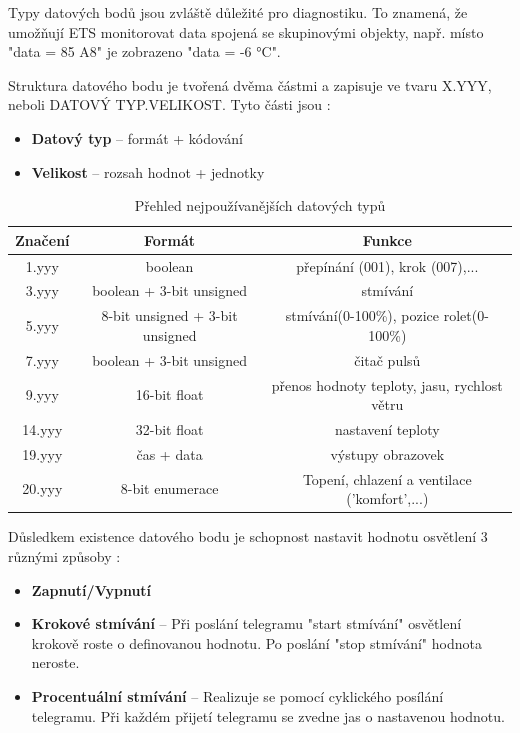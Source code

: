 \noindent Typy datových bodů jsou zvláště důležité pro diagnostiku. To znamená, že umožňují ETS monitorovat data spojená se skupinovými objekty, např. místo "data = 85 A8" je zobrazeno "data = -6 °C". \cite{Datapoint}

Struktura datového bodu je tvořená dvěma částmi a zapisuje ve tvaru X.YYY, neboli DATOVÝ TYP.VELIKOST. Tyto části jsou \cite{Datapoint}:
\begin{itemize}
    \item \textbf{Datový typ} -- formát + kódování
    \item \textbf{Velikost} -- rozsah hodnot + jednotky \newline
\end{itemize}

\begin{table}[!ht]
 \caption[Přehled nejpoužívanějších datových typů]{Přehled nejpoužívanějších datových typů}
   \small
    \centering
	  \begin{tabular}{|c|c|c|}
	    \hline
	    Značení & Formát  & Funkce  \\
	    \hline\hline
	    1.yyy & boolean & přepínání (001), krok (007),... \\
	    \hline
	    3.yyy & boolean + 3-bit unsigned & stmívání \\
	    \hline
	    5.yyy & 8-bit unsigned + 3-bit unsigned & stmívání(0-100\%), pozice rolet(0-100\%)\\
	    \hline
	    7.yyy & boolean + 3-bit unsigned & čitač pulsů \\
	    \hline
	    9.yyy & 16-bit float & přenos hodnoty teploty, jasu, rychlost větru \\
	    \hline
	    14.yyy & 32-bit float & nastavení teploty\\
	    \hline
	    19.yyy & čas + data & výstupy obrazovek \\
	    \hline
	    20.yyy & 8-bit enumerace & Topení, chlazení a ventilace ('komfort',...) \\
	    \hline
	  \end{tabular}
\end{table}

Důsledkem existence datového bodu je schopnost nastavit hodnotu osvětlení 3 různými způsoby \cite{Systemove Argumenty}:
\begin{itemize}
    \item \textbf{Zapnutí/Vypnutí}
    \item \textbf{Krokové stmívání} -- Při poslání telegramu "start stmívání" osvětlení krokově roste o definovanou hodnotu. Po poslání "stop stmívání" hodnota neroste.
    \item \textbf{Procentuální stmívání} -- Realizuje se pomocí cyklického posílání telegramu. Při každém přijetí telegramu se zvedne jas o nastavenou hodnotu.
\end{itemize}

